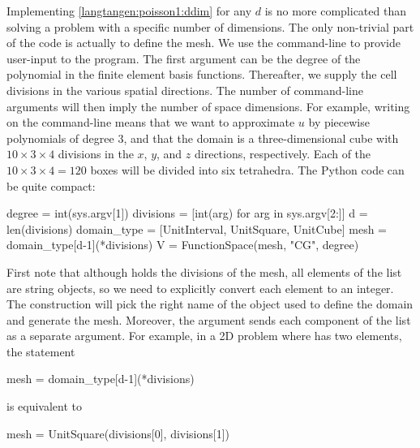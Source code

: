 Implementing \eqref{langtangen:poisson1:ddim} for any $d$ is no more
complicated than solving a problem with a specific number of dimensions.
The only non-trivial part of the code is actually to define the mesh.
We use the command-line to provide user-input to the program. The first argument
can be the degree of the polynomial in the finite element basis functions.
Thereafter, we supply the
cell divisions in the various spatial directions. The number of
command-line arguments will then imply the number of space dimensions.
For example, writing  on the command-line means that
we want to approximate $u$ by piecewise polynomials of degree 3,
and that the domain is a three-dimensional cube with $10\times 3\times 4$
divisions in the $x$, $y$, and $z$ directions, respectively.
Each of the $10\times 3\times 4 = 120$ boxes will
be divided into six tetrahedra.
The Python code can be quite compact:
\begin{python}
degree = int(sys.argv[1])
divisions = [int(arg) for arg in sys.argv[2:]]
d = len(divisions)
domain_type = [UnitInterval, UnitSquare, UnitCube]
mesh = domain_type[d-1](*divisions)
V = FunctionSpace(mesh, "CG", degree)
\end{python}
First note that although  holds the divisions of
the mesh, all elements of the list  are string objects,
so we need to explicitly convert each element to an integer.
The construction  will pick the right name of the
object used to define the domain and generate the mesh.
Moreover, the argument 
sends each component of the list  as a separate
argument. For example, in a 2D problem where  has
two elements, the statement
\begin{python}
mesh = domain_type[d-1](*divisions)
\end{python}
is equivalent to
\begin{python}
mesh = UnitSquare(divisions[0], divisions[1])
\end{python}

